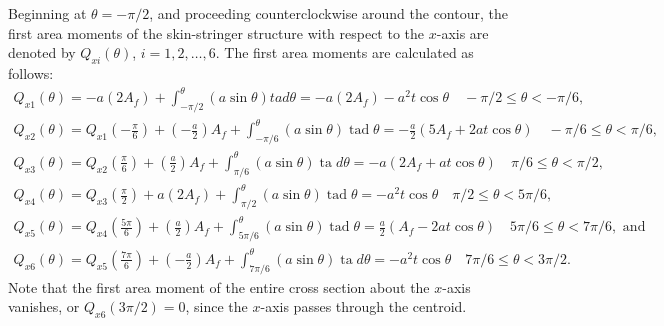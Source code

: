 \documentclass{AeroStructure-ERJohnson}
\begin{document}
\begin{example}
Beginning at $\theta=-\pi / 2$, and proceeding counterclockwise around the contour, the first area moments of the skin-stringer structure with respect to the $x$-axis are denoted by $Q_{x i}(\theta)$, $i=1,2, \ldots, 6$. The first area moments are calculated as follows:
\begin{gather}
Q_{x 1}(\theta)=-a\left(2 A_{f}\right)+\int_{-\pi / 2}^{\theta}(a \sin \theta) t a d \theta=-a\left(2 A_{f}\right)-a^{2} t \cos \theta \quad-\pi / 2 \leq \theta<-\pi / 6, \label{eq7.6.a}\tag{a} \\
Q_{x 2}(\theta)=Q_{x 1}\left(-\frac{\pi}{6}\right)+\left(-\frac{a}{2}\right) A_{f}+\int_{-\pi / 6}^{\theta}(a \sin \theta) \operatorname{tad} \theta=-\frac{a}{2}\left(5 A_{f}+2 a t \cos \theta\right) \quad-\pi / 6 \leq \theta<\pi / 6, \label{eq7.6.b}\tag{b} \\
Q_{x 3}(\theta)=Q_{x 2}\left(\frac{\pi}{6}\right)+\left(\frac{a}{2}\right) A_{f}+\int_{\pi / 6}^{\theta}(a \sin \theta) \operatorname{ta} d \theta=-a\left(2 A_{f}+a t \cos \theta\right) \quad \pi / 6 \leq \theta<\pi / 2, \label{eq7.6.c}\tag{c} \\
Q_{x 4}(\theta)=Q_{x 3}\left(\frac{\pi}{2}\right)+a\left(2 A_{f}\right)+\int_{\pi / 2}^{\theta}(a \sin \theta) \operatorname{tad} \theta=-a^{2} t \cos \theta \quad \pi / 2 \leq \theta<5 \pi / 6, \label{eq7.6.d}\tag{d} \\
Q_{x 5}(\theta)=Q_{x 4}\left(\frac{5 \pi}{6}\right)+\left(\frac{a}{2}\right) A_{f}+\int_{5 \pi / 6}^{\theta}(a \sin \theta) \operatorname{tad} \theta=\frac{a}{2}\left(A_{f}-2 a t \cos \theta\right) \quad 5 \pi / 6 \leq \theta<7 \pi / 6, \textrm{ and}\label{eq7.6.e}\tag{e}\\
Q_{x 6}(\theta)=Q_{x 5}\left(\frac{7 \pi}{6}\right)+\left(-\frac{a}{2}\right) A_{f}+\int_{7 \pi / 6}^{\theta}(a \sin \theta) \operatorname{ta} d \theta=-a^{2} t \cos \theta \quad 7 \pi / 6 \leq \theta<3 \pi / 2. \label{eq7.6.f}\tag{f}
\end{gather}
Note that the first area moment of the entire cross section about the $x$-axis vanishes, or $Q_{x 6}(3 \pi / 2)=0$, since the $x$-axis passes through the centroid.


\end{example}
\end{document}
